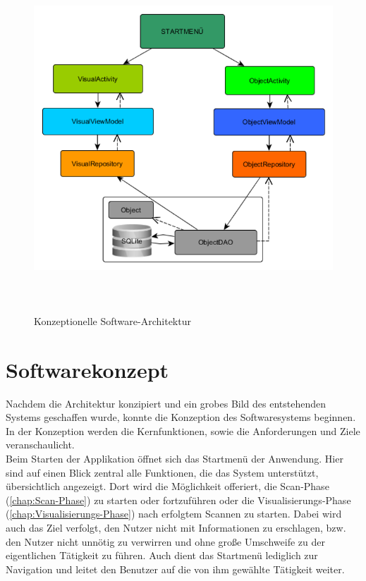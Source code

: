 \begin{figure}[hbt!]
    \centering
    \includegraphics[width=13cm,height=13cm,keepaspectratio]{3Konzeption/Bilder/architektur_konzept.png}
    \caption{Konzeptionelle Software-Architektur}
    \label{pic:architectur}
\end{figure}
\pagebreak
\section{Softwarekonzept}
\label{chap:Softwarekonzept}
Nachdem die Architektur konzipiert und ein grobes Bild des entstehenden Systems geschaffen wurde, konnte die Konzeption des 
Softwaresystems beginnen. In der Konzeption werden die Kernfunktionen, sowie die Anforderungen und Ziele veranschaulicht.
\\ 
\linebreak 
Beim Starten der Applikation öffnet sich das Startmenü der Anwendung. Hier sind auf einen Blick zentral alle Funktionen, die das System 
unterstützt, übersichtlich angezeigt. Dort wird die Möglichkeit offeriert, die Scan-Phase (\ref{chap:Scan-Phase}) zu starten oder fortzuführen 
oder die Visualisierungs-Phase (\ref{chap:Visualisierungs-Phase}) nach erfolgtem Scannen zu starten. Dabei wird auch das Ziel verfolgt, den 
Nutzer nicht mit Informationen zu erschlagen, bzw. den Nutzer nicht unnötig zu verwirren und ohne große Umschweife zu der eigentlichen Tätigkeit 
zu führen. Auch dient das Startmenü lediglich zur Navigation und leitet den Benutzer auf die von ihm gewählte Tätigkeit weiter.  
